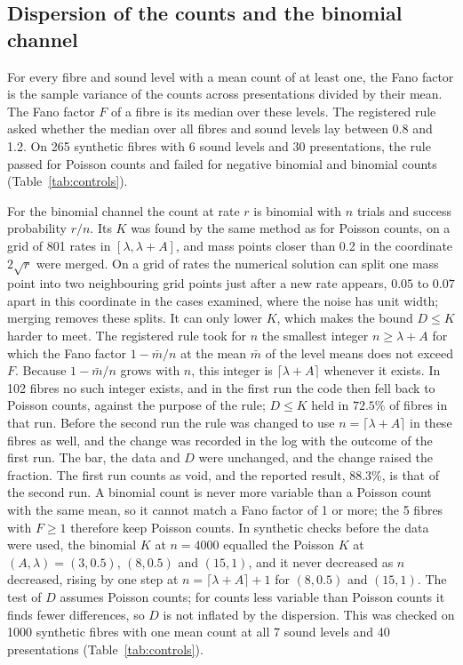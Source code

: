 \subsection{Dispersion of the counts and the binomial channel}
For every fibre and sound level with a mean count of at least one, the Fano factor is the sample variance of the counts across
presentations divided by their mean. The Fano factor $F$ of a fibre is its median over these levels. The registered rule asked whether
the median over all fibres and sound levels lay between 0.8 and 1.2. On 265 synthetic fibres with 6 sound levels and 30 presentations, the rule
passed for Poisson counts and failed for negative binomial and binomial counts (Table~\ref{tab:controls}).

For the binomial channel the count at rate $r$ is binomial with $n$ trials and success probability $r/n$. Its $K$ was found by the
same method as for Poisson counts, on a grid of 801 rates in $[\lambda,\lambda+A]$, and mass points closer than 0.2 in the
coordinate $2\sqrt r$ were merged. On a grid of rates the numerical solution can split one mass point into two neighbouring grid
points just after a new rate appears, $0.05$ to $0.07$ apart in this coordinate in the cases examined, where the noise has unit width; merging removes these
splits. It can only lower $K$, which makes the bound $D\le K$ harder to meet. The registered rule took for $n$ the smallest integer $n\ge\lambda+A$ for which the Fano factor
$1-\bar m/n$ at the mean $\bar m$ of the level means does not exceed $F$. Because $1-\bar m/n$ grows with $n$, this integer is
$\lceil\lambda+A\rceil$ whenever it exists. In 102 fibres no such integer exists, and in the first run the code then fell back to
Poisson counts, against the purpose of the rule; $D\le K$ held in $72.5\%$ of fibres in that run. Before the second run the rule was
changed to use $n=\lceil\lambda+A\rceil$ in these fibres as well, and the change was recorded in the log with the outcome of the
first run. The bar, the data and $D$ were unchanged, and the change raised the fraction. The first run counts as void, and
the reported result, $88.3\%$, is that of the second run. A binomial count is never more variable than a Poisson count
with the same mean, so it cannot match a Fano factor of 1 or more; the 5 fibres with $F\ge1$ therefore keep Poisson counts. In synthetic checks before the data were used, the binomial $K$ at $n=4000$ equalled the Poisson $K$ at
$(A,\lambda)=(3,0.5)$, $(8,0.5)$ and $(15,1)$, and it never decreased as $n$ decreased, rising by one step at
$n=\lceil\lambda+A\rceil+1$ for $(8,0.5)$ and $(15,1)$. The test of $D$ assumes Poisson counts; for counts less variable than Poisson
counts it finds fewer differences, so $D$ is not inflated by the dispersion. This was checked on 1000 synthetic fibres with one mean
count at all 7 sound levels and 40 presentations (Table~\ref{tab:controls}).

